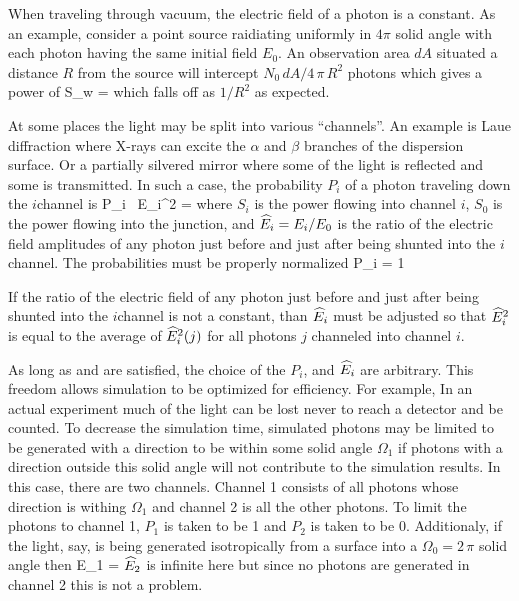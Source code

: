 When traveling through vacuum, the electric field of a photon is a
constant.  As an example, consider a point source raidiating uniformly
in $4\pi$ solid angle with each photon having the same initial field
$E_0$. An observation area $dA$ situated a distance $R$ from the
source will intercept $N_0 \, dA / 4 \, \pi \, R^2$ photons which
gives a power of
\Begineq
  S_w = 
\Endeq
which falls off as $1/R^2$ as expected.

At some places the light may be split into various ``channels''. An
example is Laue diffraction where X-rays can excite the $\alpha$ and
$\beta$ branches of the dispersion surface. Or a partially silvered
mirror where some of the light is reflected and some is transmitted.
In such a case, the probability $P_i$ of a photon traveling down the
$i$\Th channel is
\Begineq
  P_i \, \what E_i^2 = 
  \label{rpss1}
\Endeq
where $S_i$ is the power flowing into channel $i$, $S_0$ is the power
flowing into the junction, and $\widehat E_i = E_i / E_0$ is the ratio of
the electric field amplitudes of any photon just before and just after being
shunted into the $i$\Th channel. The probabilities must be properly
normalized
\Begineq
  \sum P_i = 1
  \label{p1}
\Endeq

If the ratio of the electric field of any photon just before and just
after being shunted into the $i$\Th channel is not a constant, than
$\widehat E_i$ must be adjusted so that $\widehat E_i^2$ is equal to the average of
$\widehat E_i^2(j)$ for all photons $j$ channeled into channel $i$.

As long as  and  are satisfied, the choice of the
$P_i$, and $\widehat E_i$ are arbitrary. This freedom allows simulation to be
optimized for efficiency. For example, In an actual experiment much of
the light can be lost never to reach a detector and be counted. To
decrease the simulation time, simulated photons may be limited to be
generated with a direction to be within some solid angle $\Omega_1$ if
photons with a direction outside this solid angle will not contribute
to the simulation results. In this case, there are two channels.
Channel 1 consists of all photons whose direction is withing
$\Omega_1$ and channel 2 is all the other photons. To limit the
photons to channel 1, $P_1$ is taken to be 1 and $P_2$ is taken to be
0. Additionaly, if the light, say, is being generated isotropically
from a surface into a $\Omega_0 = 2 \, \pi$ solid angle then
\Begineq
  \what E_1 = 
  \label{roo}
\Endeq
$\widehat E_2$ is infinite here but since no photons are generated in channel 2
this is not a problem.

